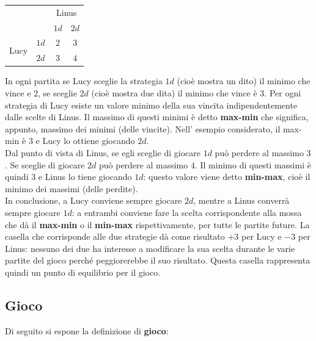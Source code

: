 \documentclass[a4paper]{extarticle}
\renewcommand\arraystretch{}
\begin{document}
\vspace{1em}
\noindent
\begin{table}[H]
    \setlength{\tabcolsep}{8pt}
    \renewcommand{\arraystretch}{1.5}
    \noindent
    \centering
    \begin{tabular}{|lc|cc|}
        \hline
        &  & \multicolumn{2}{c|}{Linus}\\
        &  & $1d$ & $2d$\\
        \hline
        \multirow{3}{*}{\vspace{1em} Lucy \vspace{2em}} & $1d$ & $2$ & $3$\\
                              & $2d$ & $3$ & $4$\\
        \hline
    \end{tabular}
\end{table} 

\vspace{1em}
\noindent
In ogni partita se Lucy sceglie la strategia $1d$ (cioè mostra un dito) il minimo che vince e $2$, se sceglie $2d$ (cioè mostra due dita) il minimo che vince è $3$. Per ogni strategia di Lucy esiste un valore minimo della sua vincita indipendentemente dalle scelte di Linus. Il massimo di questi minimi è detto \textbf{max-min} che significa, appunto, massimo dei minimi (delle vincite). Nell' esempio considerato, il max-min è 3 e Lucy lo ottiene giocando $2d$.\\
Dal punto di vista di Linus, se egli sceglie di giocare $1d$ può perdere al massimo $3$. Se sceglie di giocare $2d$ può perdere al massimo $4$. Il minimo di questi massimi è quindi $3$ e Linus lo tiene giocando $1d$: questo valore viene detto \textbf{min-max}, cioè il minimo dei massimi (delle perdite).\\
In conclusione, a Lucy conviene sempre giocare $2d$, mentre a Linus converrà sempre giocare $1d$: a entrambi conviene fare la scelta corrispondente alla mossa che dà il \textbf{max-min} o il \textbf{min-max} rispettivamente, per tutte le partite future. La casella che corrisponde alle due strategie dà come risultato $+3$ per Lucy e $-3$ per Linus: nessuno dei due ha interesse a modificare la sua scelta durante le varie partite del gioco perché peggiorerebbe il suo risultato. Questa casella rappresenta quindi un punto di equilibrio per il gioco.

\vspace{1em}
\subsection{Gioco}
Di seguito si espone la definizione di \textbf{gioco}:
\end{document}
